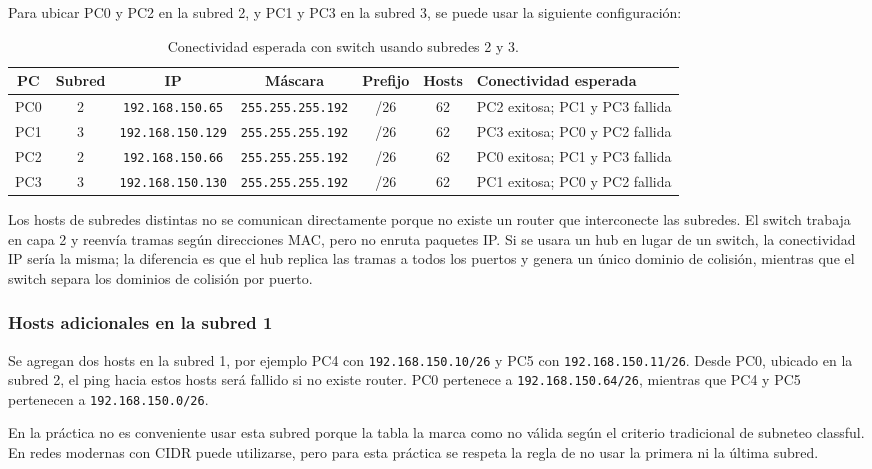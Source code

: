 \documentclass[a4paper,12pt]{article}
\newcommand{\ip}[1]{\mbox{\texttt{#1}}}
\begin{document}
Para ubicar PC0 y PC2 en la subred 2, y PC1 y PC3 en la subred 3, se puede usar la siguiente configuración:

\begin{table}[H]
\centering
\scriptsize
\begin{tabular}{|c|c|c|c|c|c|p{3.8cm}|}
\hline
PC & Subred & IP & Máscara & Prefijo & Hosts & Conectividad esperada \\
\hline
PC0 & 2 & \ip{192.168.150.65} & \ip{255.255.255.192} & /26 & 62 & PC2 exitosa; PC1 y PC3 fallida \\
PC1 & 3 & \ip{192.168.150.129} & \ip{255.255.255.192} & /26 & 62 & PC3 exitosa; PC0 y PC2 fallida \\
PC2 & 2 & \ip{192.168.150.66} & \ip{255.255.255.192} & /26 & 62 & PC0 exitosa; PC1 y PC3 fallida \\
PC3 & 3 & \ip{192.168.150.130} & \ip{255.255.255.192} & /26 & 62 & PC1 exitosa; PC0 y PC2 fallida \\
\hline
\end{tabular}
\caption{Conectividad esperada con switch usando subredes 2 y 3.}
\end{table}

Los hosts de subredes distintas no se comunican directamente porque no existe un router que interconecte las subredes. El switch trabaja en capa 2 y reenvía tramas según direcciones MAC, pero no enruta paquetes IP. Si se usara un hub en lugar de un switch, la conectividad IP sería la misma; la diferencia es que el hub replica las tramas a todos los puertos y genera un único dominio de colisión, mientras que el switch separa los dominios de colisión por puerto.



\subsubsection{Hosts adicionales en la subred 1}

Se agregan dos hosts en la subred 1, por ejemplo PC4 con \ip{192.168.150.10/26} y PC5 con \ip{192.168.150.11/26}. Desde PC0, ubicado en la subred 2, el ping hacia estos hosts será fallido si no existe router. PC0 pertenece a \ip{192.168.150.64/26}, mientras que PC4 y PC5 pertenecen a \ip{192.168.150.0/26}.

En la práctica no es conveniente usar esta subred porque la tabla la marca como no válida según el criterio tradicional de subneteo classful. En redes modernas con CIDR puede utilizarse, pero para esta práctica se respeta la regla de no usar la primera ni la última subred.
\end{document}
